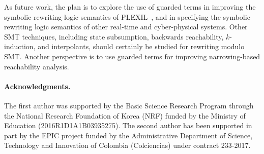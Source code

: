 As future work, the plan is to explore the use of guarded terms in
improving the symbolic rewriting logic semantics of
PLEXIL~\cite{rocha-thesis-2012,rocha-rewsmtjlamp-2017}, and in
specifying the symbolic rewriting logic semantics of other real-time
and cyber-physical systems. Other SMT techniques, including state
subsumption, backwards reachability, $k$-induction, and interpolants,
should certainly be studied for rewriting modulo SMT. Another
perspective is to use guarded terms for improving narrowing-based
reachability analysis.

{\small \paragraph*{\bf Acknowledgments.}

The first author was supported by the Basic Science Research Program
through the National Research Foundation of Korea (NRF) funded by the
Ministry of Education (2016R1D1A1B03935275). The second author has
been supported in part by the EPIC project funded by the
Administrative Department of Science, Technology and Innovation of
Colombia (Colciencias) under contract 233-2017.}
